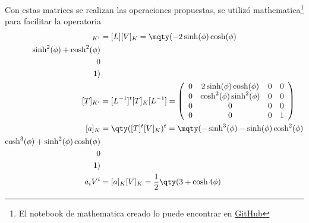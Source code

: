 Con estas matrices se realizan las operaciones propuestas, se utilizó mathematica\footnote{El notebook de mathematica creado lo puede encontrar en \href{https://github.com/DSarceno/Semestre7/tree/main/Relatividad\%20Especial/Rese\%C3\%B1a}{GitHub}} para facilitar la operatoria
	\begin{align*}
		[V]_{K'} &= [L][V]_K = \mqty(-2 \sinh (\phi) \cosh (\phi) \\ \sinh ^2(\phi)+\cosh ^2(\phi) \\ 0 \\ 1) \\
		[T]_{K'} &= [L^{-1}]^t [T]_K [L^{-1}] = \left(
			\begin{array}{cccc}
				 0 & 2\sinh (\phi) \cosh (\phi) & 0 & 0 \\
				 0 & \cosh ^2 (\phi) \sinh ^2 (\phi) & 0 & 0 \\
				 0 & 0 & 0 & 0 \\
				 0 & 0 & 0 & 1 \\
			\end{array}
			\right) \\
		[a]_K &= \qty([T]^t [V]_K)^t = \mqty(-\sinh ^3(\phi)-\sinh (\phi) \cosh ^2(\phi) \\ \cosh ^3(\phi)+\sinh ^2(\phi) \cosh (\phi) \\ 0 \\ 1) \\
		a_i V^i &= [a]_K [V]_K = \frac{1}{2} \qty(3 + \cosh{4\phi})
	\end{align*}



































